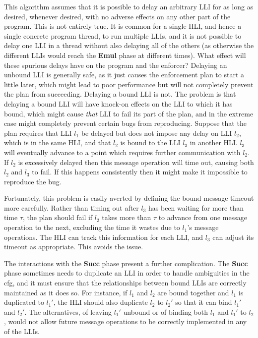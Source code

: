 This algorithm assumes that it is possible to delay an arbitrary LLI
for as long as desired, whenever desired, with no adverse effects on
any other part of the program.  This is not entirely true.  It is
common for a single HLI, and hence a single concrete program thread,
to run multiple LLIs, and it is not possible to delay one LLI in a
thread without also delaying all of the others (as otherwise the
different LLIs would reach the \textbf{Emul} phase at different
times).  What effect will these spurious delays have on the program
and the enforcer?  Delaying an unbound LLI is generally safe, as it
just causes the enforcement plan to start a little later, which might
lead to poor performance but will not completely prevent the plan from
succeeding.  Delaying a bound LLI is not.  The problem is that
delaying a bound LLI will have knock-on effects on the LLI to which it
has bound, which might cause \emph{that} LLI to fail its part of the
plan, and in the extreme case might completely prevent certain bugs
from reproducing.  Suppose that the plan requires that LLI $l_1$ be
delayed but does not impose any delay on LLI $l_2$, which is in the
same HLI, and that $l_2$ is bound to the LLI $l_3$ in another HLI.
$l_3$ will eventually advance to a point which requires further
communication with $l_2$.  If $l_2$ is excessively delayed then this
message operation will time out, causing both $l_2$ and $l_3$ to fail.
If this happens consistently then it might make it impossible to
reproduce the bug.

Fortunately, this problem is easily averted by defining the bound
message timeout more carefully.  Rather than timing out after $l_3$
has been waiting for more than time $\tau$, the plan should fail if
$l_2$ takes more than $\tau$ to advance from one message operation to
the next, excluding the time it wastes due to $l_1$'s message
operations.  The HLI can track this information for each LLI, and
$l_3$ can adjust its timeout as appropriate.  This avoids the
issue.

The interactions with the \textbf{Succ} phase present a further
complication.  The \textbf{Succ} phase sometimes needs to duplicate an
LLI in order to handle ambiguities in the \gls{cfg}, and it must
ensure that the relationships between bound LLIs are correctly
maintained as it does so.  For instance, if $l_1$ and $l_2$ are bound
together and $l_1$ is duplicated to $l_1'$, the HLI should also
duplicate $l_2$ to $l_2'$ so that it can bind $l_1'$ and $l_2'$.  The
alternatives, of leaving $l_1'$ unbound or of binding both $l_1$ and
$l_1'$ to $l_2$, would not allow future message operations to be
correctly implemented in any of the LLIs.

